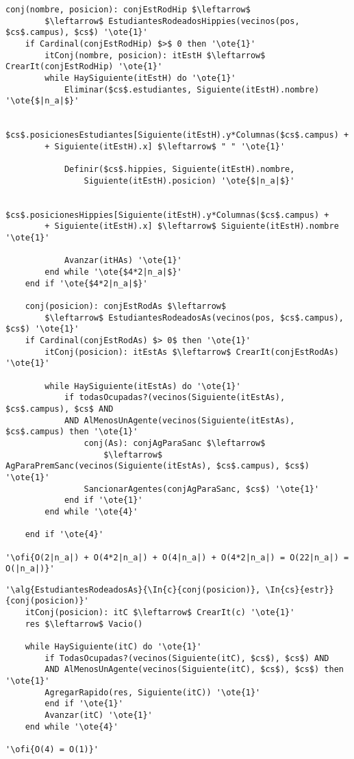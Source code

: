 \begin{lstlisting}[mathescape]
	conj(nombre, posicion): conjEstRodHip $\leftarrow$
		$\leftarrow$ EstudiantesRodeadosHippies(vecinos(pos, $cs$.campus), $cs$) '\ote{1}'
	if Cardinal(conjEstRodHip) $>$ 0 then '\ote{1}'
		itConj(nombre, posicion): itEstH $\leftarrow$ CrearIt(conjEstRodHip) '\ote{1}'	
		while HaySiguiente(itEstH) do '\ote{1}'
			Eliminar($cs$.estudiantes, Siguiente(itEstH).nombre) '\ote{$|n_a|$}'
			
			$cs$.posicionesEstudiantes[Siguiente(itEstH).y*Columnas($cs$.campus) +
		+ Siguiente(itEstH).x] $\leftarrow$ " " '\ote{1}'

			Definir($cs$.hippies, Siguiente(itEstH).nombre, 
				Siguiente(itEstH).posicion) '\ote{$|n_a|$}'
			
			$cs$.posicionesHippies[Siguiente(itEstH).y*Columnas($cs$.campus) +
		+ Siguiente(itEstH).x] $\leftarrow$ Siguiente(itEstH).nombre '\ote{1}'
		
			Avanzar(itHAs) '\ote{1}'
		end while '\ote{$4*2|n_a|$}'
	end if '\ote{$4*2|n_a|$}'

	conj(posicion): conjEstRodAs $\leftarrow$
		$\leftarrow$ EstudiantesRodeadosAs(vecinos(pos, $cs$.campus), $cs$) '\ote{1}'
	if Cardinal(conjEstRodAs) $> 0$ then '\ote{1}'
		itConj(posicion): itEstAs $\leftarrow$ CrearIt(conjEstRodAs) '\ote{1}'
		
		while HaySiguiente(itEstAs) do '\ote{1}'
			if todasOcupadas?(vecinos(Siguiente(itEstAs), $cs$.campus), $cs$ AND 
			AND AlMenosUnAgente(vecinos(Siguiente(itEstAs), $cs$.campus) then '\ote{1}'
				conj(As): conjAgParaSanc $\leftarrow$ 
					$\leftarrow$ AgParaPremSanc(vecinos(Siguiente(itEstAs), $cs$.campus), $cs$) '\ote{1}'
				SancionarAgentes(conjAgParaSanc, $cs$) '\ote{1}'
			end if '\ote{1}'
		end while '\ote{4}'

	end if '\ote{4}'

'\ofi{O(2|n_a|) + O(4*2|n_a|) + O(4|n_a|) + O(4*2|n_a|) = O(22|n_a|) = O(|n_a|)}'
\end{lstlisting}

\begin{lstlisting}[mathescape]
'\alg{EstudiantesRodeadosAs}{\In{c}{conj(posicion)}, \In{cs}{estr}}{conj(posicion)}'
	itConj(posicion): itC $\leftarrow$ CrearIt(c) '\ote{1}'
	res $\leftarrow$ Vacio()

	while HaySiguiente(itC) do '\ote{1}'
		if TodasOcupadas?(vecinos(Siguiente(itC), $cs$), $cs$) AND
		AND AlMenosUnAgente(vecinos(Siguiente(itC), $cs$), $cs$) then '\ote{1}'
		AgregarRapido(res, Siguiente(itC)) '\ote{1}'
		end if '\ote{1}'
		Avanzar(itC) '\ote{1}'
	end while '\ote{4}'

'\ofi{O(4) = O(1)}'
\end{lstlisting}

